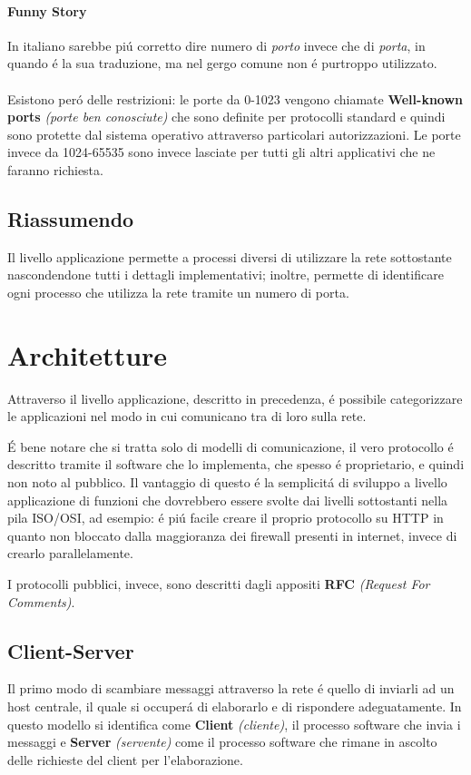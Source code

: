 \documentclass[12pt]{article}
\begin{document}
\paragraph{Funny Story} In italiano sarebbe pi\'u corretto dire numero di \textit{porto} invece che di \textit{porta}, in
quando \'e la sua traduzione, ma nel gergo comune non \'e purtroppo utilizzato.\\\\
Esistono per\'o delle restrizioni: le porte da 0-1023 vengono chiamate \textbf{Well-known ports} \textit{(porte ben 
conosciute)} che sono definite per protocolli standard e quindi sono protette dal sistema operativo attraverso particolari 
autorizzazioni. Le porte invece da 1024-65535 sono invece lasciate per tutti gli altri applicativi che ne faranno richiesta.

\subsection{Riassumendo} Il livello applicazione permette a processi diversi di utilizzare la rete sottostante nascondendone 
tutti i dettagli implementativi; inoltre, permette di identificare ogni processo che utilizza la rete tramite un 
numero di porta.

\clearpage
\section{Architetture}\label{architetture}
Attraverso il livello applicazione, descritto in precedenza, \'e possibile categorizzare le applicazioni nel modo in cui 
comunicano tra di loro sulla rete.

\'E bene notare che si tratta solo di modelli di comunicazione, il vero protocollo \'e descritto tramite il software che lo 
implementa, che spesso \'e proprietario, e quindi non noto al pubblico. Il vantaggio di questo \'e la semplicit\'a di
sviluppo a livello applicazione di funzioni che dovrebbero essere svolte dai livelli sottostanti nella pila ISO/OSI, ad 
esempio: \'e pi\'u facile creare il proprio protocollo su HTTP in quanto non bloccato dalla maggioranza dei firewall 
presenti in internet, invece di crearlo parallelamente.

I protocolli pubblici, invece, sono descritti dagli appositi \textbf{RFC} \textit{(Request For Comments)}.

\subsection{Client-Server}\label{client-server}
Il primo modo di scambiare messaggi attraverso la rete \'e quello di inviarli ad un host centrale, il quale si occuper\'a di 
elaborarlo e di rispondere adeguatamente. In questo modello si identifica come \textbf{Client} \textit{(cliente)}, il processo 
software che invia i messaggi e \textbf{Server} \textit{(servente)} come il processo software che rimane in ascolto delle richieste 
del client per l'elaborazione.
\end{document}
